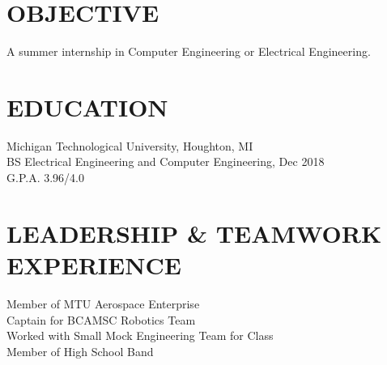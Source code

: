 \documentclass[letterpaper]{res}
\begin{document}
 


\address{\bf  PRESENT ADDRESS \\ 51280 Blue Top Cabin Rd \\ Houghton, MI 49931}
\address{\\ jaevanko@mtu.edu \\ (269) 262-6098}
\address{\bf PERMANENT ADDRESS \\ 14200 Stone Jug Road \\  Battle Creek, MI 49015}

\begin{resume}

  \section{OBJECTIVE}          
  A summer internship in Computer Engineering or Electrical Engineering.          

  \section{EDUCATION}          
  Michigan Technological University, Houghton, MI  \\        
  BS Electrical Engineering and Computer Engineering, Dec 2018   \\      
  G.P.A. 3.96/4.0          

  \section{LEADERSHIP \& TEAMWORK EXPERIENCE}
  Member of MTU Aerospace Enterprise \\
  Captain for BCAMSC Robotics Team \\
  Worked with Small Mock Engineering Team for Class \\
  Member of High School Band



\end{resume}
\end{document}
